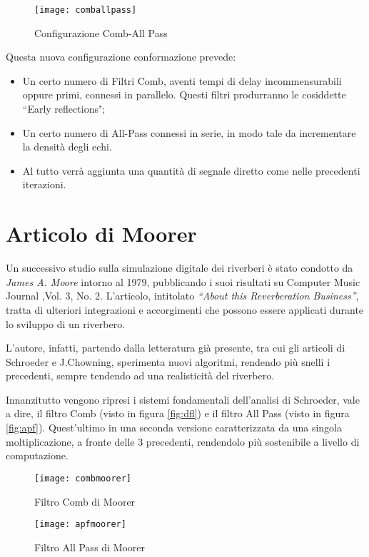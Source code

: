 \begin{figure}[htp]
\centering
\texttt{[image: comballpass]}
\caption{Configurazione Comb-All Pass}
\label{fig:comballpass}
\end{figure}

Questa nuova configurazione conformazione prevede:
\begin{itemize}
\item Un certo numero di Filtri Comb, aventi tempi di delay incommensurabili oppure primi, connessi in parallelo. Questi filtri produrranno le cosiddette “Early reflections";
\item Un certo numero di All-Pass connessi in serie, in modo tale da incrementare la densità degli echi.
\item Al tutto verrà aggiunta una quantità di segnale diretto come nelle precedenti iterazioni.
\end{itemize}

\section{Articolo di Moorer}
Un successivo studio sulla simulazione digitale dei riverberi è stato condotto da \emph{James A. Moore} intorno al 1979, pubblicando i suoi risultati  su Computer Music Journal ,Vol. 3, No. 2.
L’articolo, intitolato \emph{“About this Reverberation Business”}, tratta di ulteriori integrazioni e accorgimenti che possono essere applicati durante lo sviluppo di un riverbero.

L’autore, infatti, partendo dalla letteratura già presente, tra cui gli articoli di Schroeder e J.Chowning, sperimenta nuovi algoritmi, rendendo più snelli i precedenti, sempre tendendo ad una realisticità del riverbero.

Innanzitutto vengono ripresi i sistemi fondamentali dell’analisi di Schroeder, vale a dire, il filtro Comb (visto in figura \ref{fig:dfl}) e il filtro All Pass (visto in figura \ref{fig:apf}). Quest’ultimo in una seconda versione caratterizzata da una singola moltiplicazione, a fronte delle 3 precedenti, rendendolo più sostenibile a livello di computazione.

\begin{figure}[htp]
\centering
\texttt{[image: combmoorer]}
\caption{Filtro Comb di Moorer}
\label{fig:combmoorer}
\texttt{[image: apfmoorer]}
\caption{Filtro All Pass di Moorer}
\label{fig:apfmoorer}
\end{figure}

